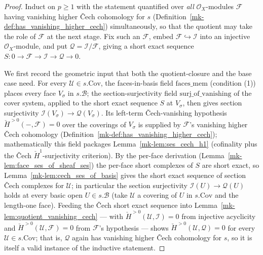 \begin{proof}
  Induct on \(p \ge 1\) with the statement quantified over \emph{all} \(\mathcal{O}_X\)-modules
  \(\mathcal{F}\) having vanishing higher {\v C}ech cohomology for \(s\)
  (Definition~\ref{mk-def:has_vanishing_higher_cech}) simultaneously, so that the quotient may take the
  role of \(\mathcal{F}\) at the next stage. Fix such an \(\mathcal{F}\), embed
  \(\mathcal{F} \hookrightarrow \mathcal{I}\) into an injective \(\mathcal{O}_X\)-module, and put
  \(\mathcal{Q} = \mathcal{I}/\mathcal{F}\), giving a short exact sequence \(S : 0 \to \mathcal{F}
  \to \mathcal{I} \to \mathcal{Q} \to 0\).

  We first record the geometric input that both the quotient-closure and the base case need. For
  every \(\mathcal{U} \in s.\mathrm{Cov}\), the faces-in-basis field \(\mathrm{faces\_mem}\) (condition
  (1)) places every face \(V_\sigma\) in \(s.\mathcal{B}\); the section-surjectivity field
  \(\mathrm{surj\_of\_vanishing}\) of the cover system, applied to the short exact sequence \(S\) at
  \(V_\sigma\), then gives section surjectivity \(\mathcal{I}(V_\sigma) \to \mathcal{Q}(V_\sigma)\).
  Its left-term {\v C}ech-vanishing hypothesis \(\check{H}^{>0}(-,\mathcal{F}) = 0\) over the coverings
  of \(V_\sigma\) is supplied by \(\mathcal{F}\)'s vanishing higher {\v C}ech cohomology
  (Definition~\ref{mk-def:has_vanishing_higher_cech}); mathematically this field packages
  Lemma~\ref{mk-lem:ses_cech_h1} (cofinality plus the {\v C}ech \(\check{H}^1\)-surjectivity criterion).
  By the per-face derivation
  (Lemma~\ref{mk-lem:face_ses_of_sheaf_ses}) the per-face short complexes of \(S\) are short exact, so
  Lemma~\ref{mk-lem:cech_ses_of_basis} gives the short exact sequence of section {\v C}ech complexes for
  \(\mathcal{U}\); in particular the section surjectivity \(\mathcal{I}(U) \to \mathcal{Q}(U)\) holds
  at every basic open \(U \in s.\mathcal{B}\) (take \(\mathcal{U}\) a covering of \(U\) in
  \(s.\mathrm{Cov}\) and the length-one face). Feeding the {\v C}ech short exact sequence into
  Lemma~\ref{mk-lem:quotient_vanishing_cech} — with \(\check{H}^{>0}(\mathcal{U}, \mathcal{I}) = 0\)
  from injective acyclicity and \(\check{H}^{>0}(\mathcal{U}, \mathcal{F}) = 0\) from
  \(\mathcal{F}\)'s hypothesis — shows \(\check{H}^{>0}(\mathcal{U}, \mathcal{Q}) = 0\) for every
  \(\mathcal{U} \in s.\mathrm{Cov}\); that is, \(\mathcal{Q}\) again has vanishing higher {\v C}ech
  cohomology for \(s\), so it is itself a valid instance of the inductive statement.


\end{proof}
